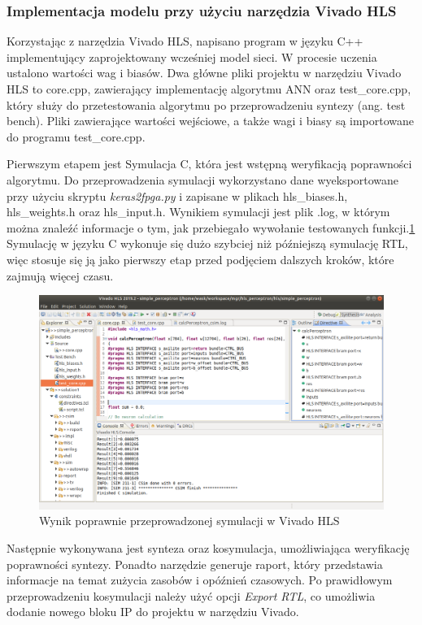 \subsubsection{Implementacja modelu przy użyciu narzędzia Vivado HLS}

Korzystając z narzędzia Vivado HLS, napisano program w języku C++ implementujący 
zaprojektowany wcześniej model sieci. W procesie uczenia ustalono wartości wag i 
biasów. Dwa główne pliki projektu w narzędziu Vivado HLS to core.cpp, zawierający 
implementację algorytmu ANN oraz test\_core.cpp, który służy do przetestowania
algorytmu po przeprowadzeniu syntezy (ang. test bench).   
Pliki zawierające wartości wejściowe, a także wagi i biasy są importowane 
do programu test\_core.cpp. 

Pierwszym etapem jest Symulacja C, która jest wstępną weryfikacją poprawności
algorytmu. Do przeprowadzenia symulacji wykorzystano dane wyeksportowane przy użyciu 
skryptu \emph{keras2fpga.py} i zapisane w plikach hls\_biases.h, hls\_weights.h oraz 
hls\_input.h. Wynikiem symulacji jest plik .log, w którym można znaleźć informacje o
tym, jak przebiegało wywołanie testowanych funkcji.\ref{hls_design_sim}
Symulację w języku C wykonuje się dużo szybciej niż późniejszą symulację RTL, więc
stosuje się ją jako pierwszy etap przed podjęciem dalszych kroków, które zajmują 
więcej czasu.

\begin{figure}
  \centering
  \includegraphics[width=\textwidth]{img/vivado_hls_sim.png}
  \caption{Wynik poprawnie przeprowadzonej symulacji w Vivado HLS}
  \label{hls_design_sim}
\end{figure}


Następnie wykonywana jest synteza oraz kosymulacja, umożliwiająca 
weryfikację poprawności syntezy. Ponadto narzędzie generuje raport, który przedstawia
informacje na temat zużycia zasobów i opóźnień czasowych. Po prawidłowym 
przeprowadzeniu kosymulacji należy użyć opcji \emph{Export RTL}, co umożliwia 
dodanie nowego bloku IP do projektu w narzędziu Vivado.

